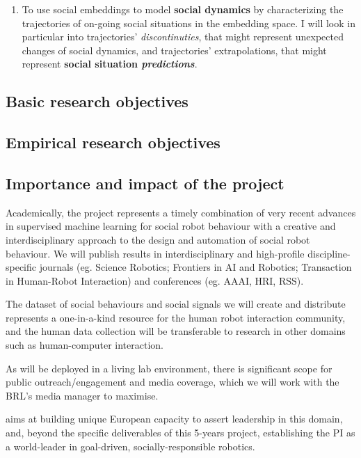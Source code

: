 \begin{rewrite}
\begin{enumerate}[label=\textbf{O\arabic*}]
    \item \label{T2} To use social embeddings to model \textbf{social dynamics}
        by characterizing the trajectories of on-going social situations in the
        embedding space. I will look in particular into trajectories'
        \emph{discontinuties}, that might represent unexpected changes of social
        dynamics, and trajectories' extrapolations, that might represent
        \textbf{social situation \emph{predictions}}.

\end{enumerate}

\end{rewrite}

\subsection{Basic research objectives}

\subsection{Empirical research objectives}


\subsection{Importance and impact of the project}

\begin{rewrite}

Academically, the \project project represents a timely combination of
very recent advances in supervised machine learning for social robot
behaviour with a creative and interdisciplinary approach to the design
and automation of social robot behaviour. 
We will publish \project results in interdisciplinary and high-profile
discipline-specific journals (eg. Science Robotics; Frontiers in AI and
Robotics; Transaction in Human-Robot Interaction) and conferences (eg. AAAI,
HRI, RSS).

The dataset of social behaviours and social signals we will create and
distribute represents a one-in-a-kind resource for the human robot
interaction community, and the human data collection will be
transferable to research in other domains such as human-computer
interaction.

As \project will be deployed in a living lab environment, there is
significant scope for public outreach/engagement and media coverage,
which we will work with the BRL's media manager to maximise.


\project aims at building unique European capacity to assert leadership in this
domain, and, beyond the specific deliverables of this 5-years project,
establishing the PI as a world-leader in goal-driven, socially-responsible
robotics.

\end{rewrite}

